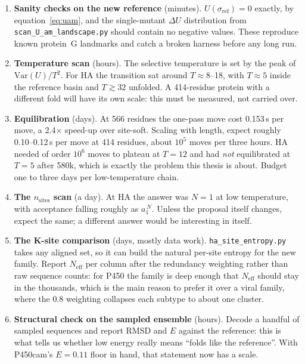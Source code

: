 \documentclass[11pt,a4paper]{article}
\newcommand{\file}[1]{\texttt{#1}}
\begin{document}
\begin{enumerate}
  \item \textbf{Sanity checks on the new reference} (minutes).
        $U(\sigma_{\text{ref}})=0$ exactly, by equation~\eqref{eq:uam}, and the
        single-mutant $\Delta U$ distribution from
        \file{scan\_U\_am\_landscape.py} should contain no negative values. These
        reproduce known protein~G landmarks and catch a broken harness before any
        long run.
  \item \textbf{Temperature scan} (hours). The selective temperature is set by
        the peak of $\mathrm{Var}(U)/T^2$. For HA the transition sat around
        $T\approx8$--18, with $T\approx5$ inside the reference basin and
        $T\gtrsim32$ unfolded. A 414-residue protein with a different fold will
        have its own scale: this must be measured, not carried over.
  \item \textbf{Equilibration} (days). At 566 residues the one-pass move cost
        0.153\,s per move, a 2.4$\times$ speed-up over site-soft. Scaling with
        length, expect roughly 0.10--0.12\,s per move at 414 residues, about
        $10^5$ moves per three hours. HA needed of order $10^6$ moves to plateau
        at $T=12$ and had \emph{not} equilibrated at $T=5$ after 580k, which is
        exactly the problem this thesis is about. Budget one to three days per
        low-temperature chain.
  \item \textbf{The $n_{\text{sites}}$ scan} (a day). At HA the answer was $N=1$
        at low temperature, with acceptance falling roughly as $a_1^{\,N}$.
        Unless the proposal itself changes, expect the same; a different answer
        would be interesting in itself.
  \item \textbf{The K-site comparison} (days, mostly data work).
        \file{ha\_site\_entropy.py} takes any aligned set, so it can build the
        natural per-site entropy for the new family. Report $N_{\text{eff}}$ per
        column after the redundancy weighting rather than raw sequence counts:
        for P450 the family is deep enough that $N_{\text{eff}}$ should stay in
        the thousands, which is the main reason to prefer it over a viral family,
        where the 0.8 weighting collapses each subtype to about one cluster.
  \item \textbf{Structural check on the sampled ensemble} (hours). Decode a
        handful of sampled sequences and report RMSD and $E$ against the
        reference: this is what tells us whether low energy really means ``folds
        like the reference''. With P450cam's $E=0.11$ floor in hand, that
        statement now has a scale.
\end{enumerate}
\end{document}
